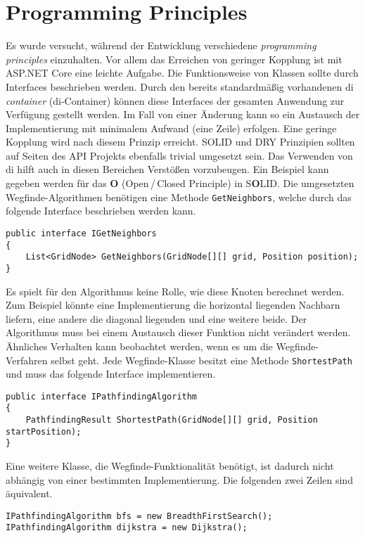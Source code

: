 \part{Programming Principles}
Es wurde versucht, während der Entwicklung
verschiedene \textit{programming principles} einzuhalten.
Vor allem das Erreichen von geringer Kopplung ist mit
ASP.NET Core eine leichte Aufgabe.
Die Funktionsweise von Klassen sollte durch Interfaces beschrieben werden.
Durch den bereits standardmäßig vorhandenen \acl{di} \textit{container} (\acs{di}-Container)
können diese Interfaces der gesamten Anwendung zur Verfügung gestellt werden.
Im Fall von einer Änderung kann so ein Austausch der
Implementierung mit minimalem Aufwand (eine Zeile) erfolgen.
Eine geringe Kopplung wird nach diesem Prinzip erreicht.
SOLID und DRY Prinzipien sollten auf Seiten des API Projekts ebenfalls trivial umgesetzt sein.
Das Verwenden von \acs{di} hilft auch in diesen Bereichen Verstößen vorzubeugen.
Ein Beispiel kann gegeben werden für das \textbf{O} (Open\,/\,Closed Principle)
in S\textbf{O}LID. Die umgesetzten Wegfinde-Algorithmen benötigen eine Methode
\texttt{GetNeighbors}, welche durch das folgende
Interface beschrieben werden kann.

\begin{lstlisting}[caption={GetNeighbors Interface},label={code:i-get-neighbors}]
public interface IGetNeighbors
{
    List<GridNode> GetNeighbors(GridNode[][] grid, Position position);
}
\end{lstlisting}
Es spielt für den Algorithmus keine Rolle, wie diese Knoten berechnet werden.
Zum Beispiel könnte eine Implementierung die horizontal liegenden Nachbarn liefern,
eine andere die diagonal liegenden und eine weitere beide. Der Algorithmus muss bei
einem Austausch dieser Funktion nicht verändert werden. Ähnliches Verhalten kann
beobachtet werden, wenn es um die Wegfinde-Verfahren selbst geht.
Jede Wegfinde-Klasse besitzt eine Methode \texttt{ShortestPath}
und muss das folgende Interface implementieren.
\begin{lstlisting}[caption={Wegfinde-Algorithmus Interface},label={code:i-pathfinding}]
public interface IPathfindingAlgorithm
{
    PathfindingResult ShortestPath(GridNode[][] grid, Position startPosition);
}
\end{lstlisting}
Eine weitere Klasse, die Wegfinde-Funktionalität benötigt, ist dadurch nicht abhängig
von einer bestimmten Implementierung. Die folgenden zwei Zeilen sind
äquivalent.
\begin{lstlisting}[caption={Abstraktion der Wegfinde-Algorithmen}]
IPathfindingAlgorithm bfs = new BreadthFirstSearch();
IPathfindingAlgorithm dijkstra = new Dijkstra();
\end{lstlisting}